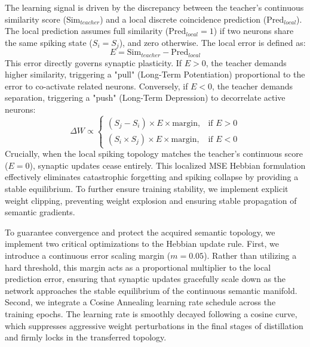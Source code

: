 \documentclass{article} %
\begin{document}
The learning signal is driven by the discrepancy between the teacher's continuous similarity score ($\text{Sim}_{teacher}$) and a local discrete coincidence prediction ($\text{Pred}_{local}$). The local prediction assumes full similarity ($\text{Pred}_{local} = 1$) if two neurons share the same spiking state ($S_i = S_j$), and zero otherwise. The local error is defined as:
\begin{equation}
E = \text{Sim}_{teacher} - \text{Pred}_{local}
\end{equation}
This error directly governs synaptic plasticity. If $E > 0$, the teacher demands higher similarity, triggering a "pull" (Long-Term Potentiation) proportional to the error to co-activate related neurons. Conversely, if $E < 0$, the teacher demands separation, triggering a "push" (Long-Term Depression) to decorrelate active neurons:
\begin{equation}
\Delta W \propto 
\begin{cases} 
(S_j - S_i) \times E \times \text{margin}, & \text{if } E > 0 \\
(S_i \times S_j) \times E \times \text{margin}, & \text{if } E < 0 
\end{cases}
\end{equation}
Crucially, when the local spiking topology matches the teacher's continuous score ($E = 0$), synaptic updates cease entirely. This localized MSE Hebbian formulation effectively eliminates catastrophic forgetting and spiking collapse by providing a stable equilibrium. To further ensure training stability, we implement explicit weight clipping, preventing weight explosion and ensuring stable propagation of semantic gradients.

To guarantee convergence and protect the acquired semantic topology, we implement two critical optimizations to the Hebbian update rule. First, we introduce a continuous error scaling margin ($m=0.05$). Rather than utilizing a hard threshold, this margin acts as a proportional multiplier to the local prediction error, ensuring that synaptic updates gracefully scale down as the network approaches the stable equilibrium of the continuous semantic manifold. Second, we integrate a Cosine Annealing learning rate schedule across the training epochs. The learning rate is smoothly decayed following a cosine curve, which suppresses aggressive weight perturbations in the final stages of distillation and firmly locks in the transferred topology.
\end{document}
